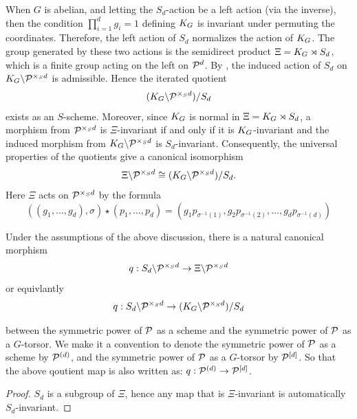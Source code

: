 
When $G$ is abelian, and letting the $S_d$-action be a left action (via the inverse), then
the condition  $\prod_{i=1}^d g_i = 1$ defining $K_{G}$ is invariant under permuting the coordinates.
Therefore, the left action of $S_d$ normalizes the action of $K_{G}$.
The group generated by these two actions is the semidirect product $\Xi = K_{G} \rtimes S_d$,
which is a finite group acting on the left on $\mathcal{P}^d$.
By , the induced action of $S_d$ on
$K_{G}\backslash\mathcal{P}^{\times_S d}$ is admissible. Hence the iterated quotient
\[
(K_{G}\backslash\mathcal{P}^{\times_S d})/S_d
\]
exists as an $S$-scheme. Moreover, since $K_{G}$ is normal in
$\Xi=K_{G}\rtimes S_d$, a morphism from $\mathcal{P}^{\times_S d}$ is
$\Xi$-invariant if and only if it is $K_{G}$-invariant and the induced
morphism from $K_{G}\backslash\mathcal{P}^{\times_S d}$ is $S_d$-invariant.
Consequently, the universal properties of the quotients give a canonical
isomorphism
\[
\Xi\backslash\mathcal{P}^{\times_S d}
\cong
(K_{G}\backslash\mathcal{P}^{\times_S d})/S_d.
\]
Here $\Xi$ acts on $\mathcal{P}^{\times_S d}$ by the formula
$$((g_1, \dots, g_d), \sigma) \star (p_1, \dots, p_d) = (g_1 p_{\sigma^{-1}(1)}, g_2 p_{\sigma^{-1}(2)}, \dots, g_d p_{\sigma^{-1}(d)})$$


\begin{cor}\label{cor:sym-power-quotient}
    Under the assumptions of the above discussion, there is a natural canonical morphism 
    $$q: S_d \backslash \mathcal{P}^{\times_S d} \to \Xi \backslash \mathcal{P}^{\times_S d}$$
    or equivlantly
    $$ q: S_d \backslash \mathcal{P}^{\times_S d} \to (K_{G} \backslash \mathcal{P}^{\times_S d}) / S_d$$

    between the symmetric power of $\mathcal{P}$ as a scheme and the symmetric power of $\mathcal{P}$ as a $G$-torsor.
    We make it a convention to denote the symmetric power of $\mathcal{P}$ as a scheme by 
    $\mathcal{P}^{(d)}$, and the symmetric power of $\mathcal{P}$ as a $G$-torsor by $\mathcal{P}^{[d]}$. 
    So that the above qoutient map is also written as:
    $q: \mathcal{P}^{(d)} \to \mathcal{P}^{[d]}$.
\end{cor}

\begin{proof}
    $S_d$ is a subgroup of $\Xi$,
    hence any map that is $\Xi$-invariant is automatically $S_d$-invariant.
\end{proof}


